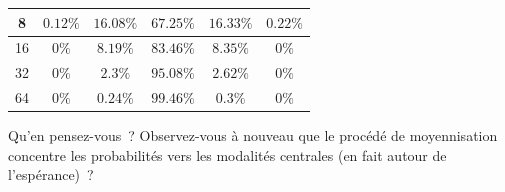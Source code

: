 \documentclass[10pt]{report}
\begin{document}
\begin{exercice}
\begin{enumerate}
\begin{tabular}{|c|c|c|c|c|c|}
\\\hline
8 &\phantom{$\Big($}$0.12\%$&\phantom{$\Big($}$16.08\%$&\phantom{$\Big($}$67.25\%$&\phantom{$\Big($}$16.33\%$&\phantom{$\Big($}$0.22\%$
\\\hline
16 &\phantom{$\Big($}$0\%$&\phantom{$\Big($}$8.19\%$&\phantom{$\Big($}$83.46\%$&\phantom{$\Big($}$8.35\%$&\phantom{$\Big($}$0\%$
\\\hline
32 &\phantom{$\Big($}$0\%$&\phantom{$\Big($}$2.3\%$&\phantom{$\Big($}$95.08\%$&\phantom{$\Big($}$2.62\%$&\phantom{$\Big($}$0\%$
\\\hline
64 &\phantom{$\Big($}$0\%$&\phantom{$\Big($}$0.24\%$&\phantom{$\Big($}$99.46\%$&\phantom{$\Big($}$0.3\%$&\phantom{$\Big($}$0\%$
\\\hline
\end{tabular}

Qu'en pensez-vous~? Observez-vous à nouveau que le procédé de moyennisation concentre les probabilités vers les modalités centrales (en fait autour de l'espérance)~?


\end{enumerate}
\end{exercice}
\end{document}
